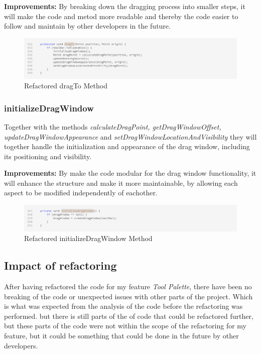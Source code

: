 \textbf{Improvements:} By breaking down the dragging process into smaller steps, it will make the code and metod more readable and thereby the code easier to follow and maintain
by other developers in the future.

\begin{figure}[H]
    \centering
    \includegraphics[width=\linewidth]{pic/F dragTo.png}
    \caption{Refactored dragTo Method}
    \label{fig:Refactored dragTo Method}
\end{figure}






\subsubsection{initializeDragWindow}
Together with the methods \textit{calculateDragPoint, getDragWindowOffset, updateDragWindowAppearance} and \textit{setDragWindowLocationAndVisibility} they will
together handle the initialization and appearance of the drag window, including its positioning and visibility.

\textbf{Improvements:} By make the code modular for the drag window functionality, it will enhance the structure and make it more maintainable,
by allowing each aspect to be modified independently of eachother.

\begin{figure}[H]
    \centering
    \includegraphics[width=\linewidth]{pic/F initializeDragWindow.png}
    \caption{Refactored initializeDragWindow Method}
    \label{fig:Refactored initializeDragWindow Method}
\end{figure}

\subsection{Impact of refactoring}
After having refactored the code for my feature \textit{Tool Palette}, there have been no breaking of the code or unexpected issues with other parts of the project.
Which is what was expected from the analysis of the code before the refactoring was performed. but there is still parts of the of code that could be refactored further,
but these parts of the code were not within the scope of the refactoring for my feature, but it could be something that could be done in the future by other developers.





